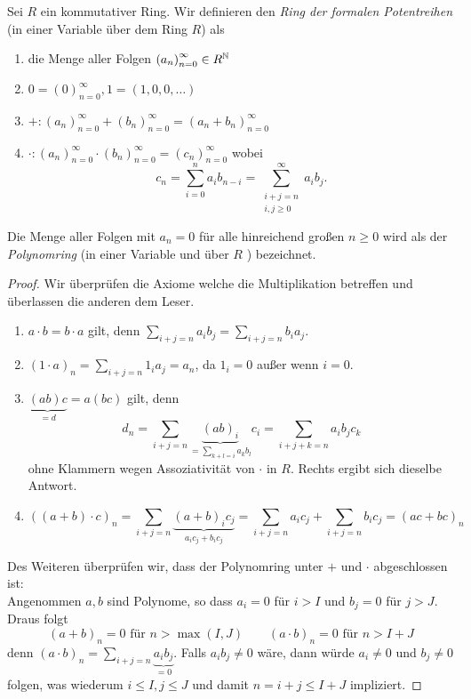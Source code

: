 \begin{definition}
	Sei $R$ ein kommutativer Ring. Wir definieren den \emph{Ring der formalen Potentreihen} (in einer Variable über dem Ring $R $) als 
	\begin{enumerate}
		\item die Menge aller Folgen $\left(a_{n}\right)^{\infty}_{n=0} \in R^{\mathbb{N}}$
		\item $0 = \left(0\right)^{\infty}_{n=0}, 1 = (1,0,0,\ldots)$ 
		\item $+: \left(a_{n}\right)^{\infty}_{n=0} + \left(b_{n}\right)^{\infty}_{n=0} = (a_{n} + b_{n})^{\infty}_{n=0}$ 
		\item $\cdot: \left(a_{n}\right)^{\infty}_{n=0} \cdot \left(b_{n}\right)^{\infty}_{n=0} = \left(c_{n}\right)^{\infty}_{n=0} $ wobei
			\[
				c_{n} = \sum_{i=0}^{n} a_{i} b_{n-i} = \sum_{\substack{i+j=n \\ i,j \geq 0}}^{\infty} a_{i} b_{j}
			.\] 
	\end{enumerate}
	Die Menge aller Folgen mit $a_{n} = 0$ für alle hinreichend großen $n \geq 0$ wird als der \emph{Polynomring} (in einer Variable und über $R$ ) bezeichnet.
\end{definition}

\begin{proof}
	Wir überprüfen die Axiome welche die Multiplikation betreffen und überlassen die anderen dem Leser.
	\begin{enumerate}
		\item $a\cdot b = b\cdot a$ gilt, denn $\sum_{i+j=n} a_{i} b_{j} = \sum_{i+j=n} b_{i} a_{j}$.
		\item $(1\cdot a)_{n} = \sum_{i+j=n} 1_{i} a_{j} = a_{n}$, da $1_{i} = 0$ außer wenn  $i=0$.
		\item $\underbrace{(ab)c}_{=d} = a(bc)$ gilt, denn
			\[
				d_{n} = \sum_{i+j = n} \underbrace{(ab)_{i}}_{= \sum_{k+l = i} a_{k} b_{l}} c_{i} = \sum_{i+j+k=n} a_{i} b_{j} c_{k}
			\] 
			ohne Klammern wegen Assoziativität von $\cdot $ in $R$. Rechts ergibt sich dieselbe Antwort.
		\item \[((a+b)\cdot c)_{n} = \sum_{i+j=n} \underbrace{(a+b)_{i} c_{j}}_{a_{i} c_{j} + b_{i} c_{j}} = \sum_{i+j=n} a_{i} c_{j} + \sum_{i+j=n} b_{i} c_{j} = (ac +bc)_{n}\]
	\end{enumerate}
	Des Weiteren überprüfen wir, dass der Polynomring unter $+$ und $\cdot $ abgeschlossen ist:\\
	Angenommen $a,b$ sind Polynome, so dass $a_{i} = 0$ für $i > I$ und $b_{j} = 0$ für $j > J$.
	Draus folgt 
	\[
		(a+b)_{n} = 0 \text{ für } n > \max(I,J) \qquad (a\cdot b)_{n} = 0 \text{ für } n > I+J
	\]
	denn $(a\cdot b)_{n} = \sum_{i+j=n} \underbrace{a_{i} b_{j}}_{=0}$. Falls $a_{i} b_{j} \neq  0$ wäre, dann würde $a_{i}\neq 0$ und $b_{j} \neq 0$ folgen,
	was wiederum $i \leq I, j \leq J$ und damit $n=i+j \leq I+J$ impliziert.
\end{proof}


